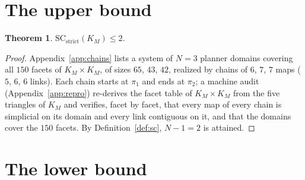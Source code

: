 \documentclass[11pt]{article}
\newtheorem{theorem}{Theorem}
\theoremstyle{remark}
\begin{document}
\section{The upper bound}

\begin{theorem}\label{thm:upper}
$\mathrm{SC}_{\mathrm{strict}}(K_M)\le2$.
\end{theorem}
\begin{proof}
Appendix~\ref{app:chains} lists a system of $N=3$ planner domains covering
all $150$ facets of $K_M\times K_M$, of sizes $65$, $43$, $42$, realized by
chains of $6$, $7$, $7$ maps ($5$, $6$, $6$ links).  Each chain starts at
$\pi_1$ and ends at $\pi_2$; a machine audit (Appendix~\ref{app:repro})
re-derives the facet table of $K_M\times K_M$ from the five triangles of
$K_M$ and verifies, facet by facet, that every map of every chain is
simplicial on its domain and every link contiguous on it, and that the
domains cover the $150$ facets.  By Definition~\ref{def:sc},
$N-1=2$ is attained.
\end{proof}

\section{The lower bound}
\end{document}
